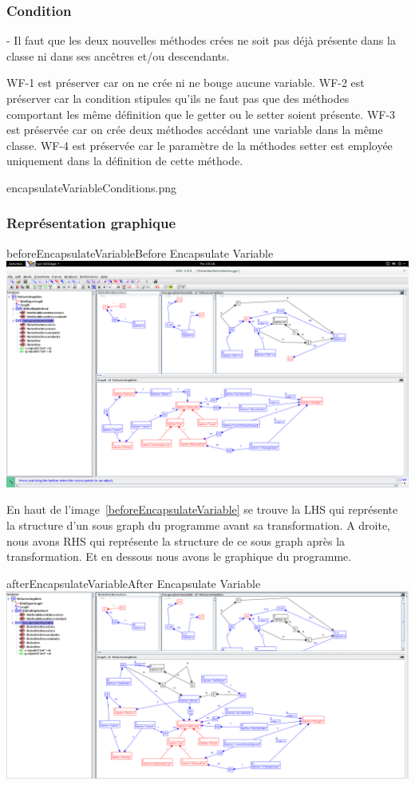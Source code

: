 \documentclass[a4paper, 10pt]{article}
\begin{document}
\subsubsection{Condition}

- Il faut que les deux nouvelles méthodes crées ne soit pas déjà présente dans la classe ni dans ses ancêtres et/ou descendants.

WF-1 est préserver car on ne crée ni ne bouge aucune variable.
WF-2 est préserver car la condition stipules qu'ils ne faut pas que des méthodes comportant les même définition que le getter ou le setter soient présente.
WF-3 est préservée car on crée deux méthodes accédant une variable dans la même classe.
WF-4 est préservée car le paramètre de la méthodes setter est employée uniquement dans la définition de cette méthode.

encapsulateVariableConditions.png

\subsubsection{Représentation graphique}

\begin{myfig}{beforeEncapsulateVariable}{Before Encapsulate Variable}
\includegraphics[width=\textwidth]{beforeEncapsulateVariable.png}
\end{myfig}

En haut de l'image~\ref{beforeEncapsulateVariable} se trouve la LHS qui représente la structure d'un sous graph du programme avant sa transformation. A droite, nous avons RHS qui représente la structure de ce sous graph après la transformation. Et en dessous nous avons le graphique du programme.

\begin{myfig}{afterEncapsulateVariable}{After Encapsulate Variable}
\includegraphics[width=\textwidth]{afterEncapsulateVariable.png}
\end{myfig}
\end{document}
